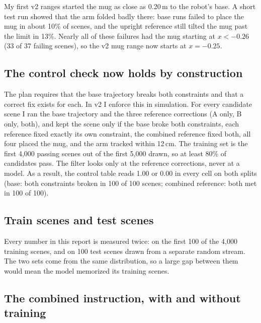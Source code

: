 \documentclass[11pt]{article}
\begin{document}
My first v2 ranges started the mug as close as 0.20\,m to the robot's base. A short test run showed
that the arm folded badly there: base runs failed to place the mug in about 10\% of scenes, and the
upright reference still tilted the mug past the limit in 13\%. Nearly all of these failures had the
mug starting at $x < -0.26$ (33 of 37 failing scenes), so the v2 mug range now starts at $x = -0.25$.

\subsection{The control check now holds by construction}

The plan requires that the base trajectory breaks both constraints and that a correct fix exists for
each. In v2 I enforce this in simulation. For every candidate scene I ran the base trajectory and the
three reference corrections (A only, B only, both), and kept the scene only if the base broke both
constraints, each reference fixed exactly its own constraint, the combined reference fixed both, all
four placed the mug, and the arm tracked within 12\,cm. The training set is the first 4{,}000 passing
scenes out of the first 5{,}000 drawn, so at least 80\% of candidates pass. The filter looks only at
the reference corrections, never at a model. As a result, the control table reads 1.00 or 0.00 in every
cell on both splits (base: both constraints broken in 100 of 100 scenes; combined reference: both met
in 100 of 100).

\subsection{Train scenes and test scenes}

Every number in this report is measured twice: on the first 100 of the 4{,}000 training scenes, and on
100 test scenes drawn from a separate random stream. The two sets come from the same distribution, so
a large gap between them would mean the model memorized its training scenes.

\subsection{The combined instruction, with and without training}
\end{document}
